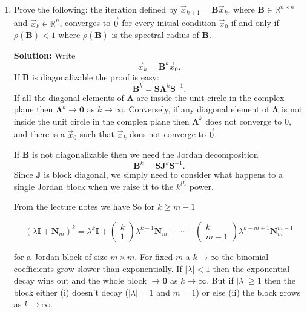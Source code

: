 \documentclass[11pt,fleqn]{article}
\newcommand{\mat}[1]{\mathbf{#1}}
\begin{document}
\begin{enumerate}
\item Prove the following: the iteration defined by $\vec{x}_{k+1}=\mat{B}\vec{x}_k$, where $\mat{B}\in\mathbb{R}^{n\times n}$ and $\vec{x}_k\in\mathbb{R}^n$,  converges to $\vec{0}$ for every initial condition $\vec{x}_0$ if and only if $\rho(\mat{B})<1$ where $\rho(\mat{B})$ is the spectral radius of $\mat{B}$.

{\bf Solution:} Write
\[\vec{x}_k = \mathbf{B}^k\vec{x}_0.\]
 If $\mathbf{B}$ is diagonalizable the proof is easy:
 \[\mathbf{B}^k = \mathbf{S\Lambda}^k\mathbf{S}^{-1}.\]
 If all the diagonal elements of $\mathbf{\Lambda}$ are inside the unit circle in the complex plane then $\mathbf{\Lambda}^k\to\mathbf{0}$ as $k\to\infty$.
 Conversely, if any diagonal element of $\mathbf{\Lambda}$ is not inside the unit circle in the complex plane then $\mathbf{\Lambda}^k$ does not converge to 0, and there is a $\vec{x}_0$ such that $\vec{x}_k$ does not converge to $\vec{0}$.
 
 If $\mathbf{B}$ is not diagonalizable then we need the Jordan decomposition
 \[\mathbf{B}^k = \mathbf{SJ}^k\mathbf{S}^{-1}.\]
 Since $\mathbf{J}$ is block diagonal, we simply need to consider what happens to a single Jordan block when we raise it to the $k^{th}$ power.
 
 From the lecture notes we have
 So for $k\ge m-1$

$$(\lambda\mathbf{I} + \mathbf{N}_m)^k = \lambda^k\mathbf{I} + \left(\begin{array}{c}k\\1\end{array}\right)\lambda^{k-1}\mathbf{N}_m + \cdots + \left(\begin{array}{c}k\\m-1\end{array}\right)\lambda^{k-m+1}\mathbf{N}_m^{m-1}$$

for a Jordan block of size $m\times m$.
For fixed $m$ a $k\to\infty$ the binomial coefficients grow slower than exponentially.
If $|\lambda|<1$ then the exponential decay wins out and the whole block $\to\mathbf{0}$ as $k\to\infty$.
But if $|\lambda|\ge 1$ then the block either (i) doesn't decay ($|\lambda|=1$ and $m=1$) or else (ii) the block grows as $k\to\infty$.

\end{enumerate}
 
\end{document}
